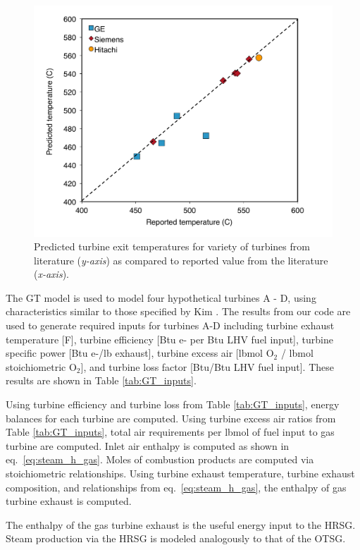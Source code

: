 \documentclass[11pt]{report}
\newcommand{\marg}[1]{{\footnotesize\textit{\textcolor{stanford}{'#1'}}}}
\newcommand{\marginnote}[1]{\marginpar{\marg{#1}}}
\begin{document}
\begin{figure}[t]
\includegraphics[width=0.8\columnwidth]{images/GT_predictions.pdf}
\caption{Predicted turbine exit temperatures for variety of turbines from literature (\emph{y-axis}) as compared to reported value from the literature (\emph{x-axis}). }
\label{fig:GT_predictions}
\end{figure}

The GT model is used to model four hypothetical turbines A - D, using characteristics similar to those specified by Kim \cite{Kim2004}. \marginnote{Input data \\ Table 3.1} The results from our code are used to generate required inputs for turbines A-D including turbine exhaust temperature [F], turbine efficiency [Btu e- per Btu LHV fuel input], turbine specific power [Btu e-/lb exhaust], turbine excess air [lbmol O$_2$ / lbmol stoichiometric O$_2$], and turbine loss factor [Btu/Btu LHV fuel input]. These results are shown in Table \ref{tab:GT_inputs}.

Using turbine efficiency and turbine loss from Table \ref{tab:GT_inputs}, \marginnote{Steam Generation 2.3.1} energy balances for each turbine are computed. Using turbine excess air ratios from Table \ref{tab:GT_inputs}, total air requirements per lbmol of fuel input to gas turbine are computed. \marginnote{Steam Generation 2.3.5} Inlet air enthalpy is computed as shown in eq.\ \eqref{eq:steam_h_gas}. Moles of combustion products are computed via stoichiometric relationships. \marginnote{Steam Generation 3.3.5.1} Using turbine exhaust temperature, turbine exhaust composition, and relationships from eq.\ \eqref{eq:steam_h_gas}, the enthalpy of gas turbine exhaust is computed.

The enthalpy of the gas turbine exhaust is the useful energy input to the HRSG. \marginnote{Steam Generation 2.3.5} Steam production via the HRSG is modeled analogously to that of the OTSG.
\end{document}
